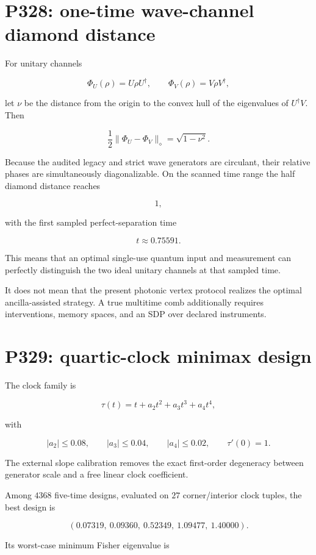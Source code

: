 \documentclass[11pt,a4paper,openany]{report}
\begin{document}
\section{P328: one-time wave-channel diamond distance}

For unitary channels

\[
\Phi_U(\rho)=U\rho U^\dagger,
\qquad
\Phi_V(\rho)=V\rho V^\dagger,
\]

let \(\nu\) be the distance from the origin to the convex hull of the eigenvalues of \(U^\dagger V\).  Then

\[
\frac12\|\Phi_U-\Phi_V\|_\diamond
=\sqrt{1-\nu^2}.
\]

Because the audited legacy and strict wave generators are circulant, their relative phases are simultaneously diagonalizable.  On the scanned time range the half diamond distance reaches

\[
1,
\]

with the first sampled perfect-separation time

\[
t\approx0.75591.
\]

This means that an optimal single-use quantum input and measurement can perfectly distinguish the two ideal unitary channels at that sampled time.

It does not mean that the present photonic vertex protocol realizes the optimal ancilla-assisted strategy.  A true multitime comb additionally requires interventions, memory spaces, and an SDP over declared instruments.

\section{P329: quartic-clock minimax design}

The clock family is

\[
\tau(t)=
t+a_2t^2+a_3t^3+a_4t^4,
\]

with

\[
|a_2|\le0.08,\qquad
|a_3|\le0.04,\qquad
|a_4|\le0.02,
\qquad
\tau'(0)=1.
\]

The external slope calibration removes the exact first-order degeneracy between generator scale and a free linear clock coefficient.

Among \(4368\) five-time designs, evaluated on \(27\) corner/\allowbreak{}interior clock tuples, the best design is

\[
(0.07319,\ 0.09360,\ 0.52349,\ 1.09477,\ 1.40000).
\]

Its worst-case minimum Fisher eigenvalue is
\end{document}
